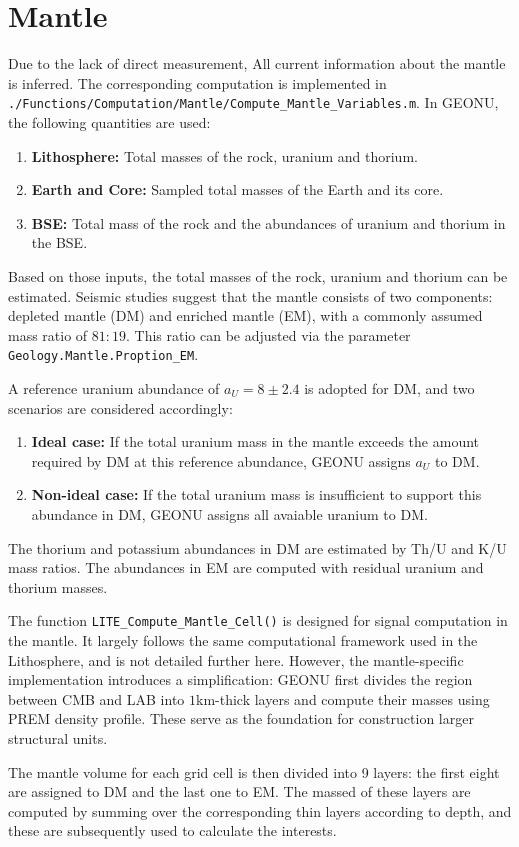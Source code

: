 		\section{Mantle}
			Due to the lack of direct measurement, All current information about the mantle is inferred. The corresponding computation is implemented in \texttt{./Functions/Computation/Mantle/Compute\_Mantle\_Variables.m}. In GEONU, the following quantities are used:
				\begin{enumerate}
					\item \textbf{Lithosphere:} Total masses of the rock, uranium and thorium.
					\item \textbf{Earth and Core:} Sampled total masses of the Earth and its core.
					\item \textbf{BSE:} Total mass of the rock and the abundances of uranium and thorium in the BSE.
				\end{enumerate}
			Based on those inputs, the total masses of the rock, uranium and thorium can be estimated. Seismic studies suggest that the mantle consists of two components: depleted mantle (DM) and enriched mantle (EM), with a commonly assumed mass ratio of $81:19$. This ratio can be adjusted via the parameter \texttt{Geology.Mantle.Proption\_EM}.\par
			A reference uranium abundance of $a_U = 8 \pm 2.4$ is adopted for DM, and two scenarios are considered accordingly:
				\begin{enumerate}
					\item \textbf{Ideal case:} If the total uranium mass in the mantle exceeds the amount required by DM at this reference abundance, GEONU assigns $a_U$ to DM.
					\item \textbf{Non-ideal case:} If the total uranium mass is insufficient to support this abundance in DM, GEONU assigns all avaiable uranium to DM.
				\end{enumerate}
			The thorium and potassium abundances in DM are estimated by Th/U and K/U mass ratios. The abundances in EM are computed with residual uranium and thorium masses.\par
			The function \texttt{LITE\_Compute\_Mantle\_Cell()} is designed for signal computation in the mantle. It largely follows the same computational framework used in the Lithosphere, and is not detailed further here. However, the mantle-specific implementation introduces a simplification: GEONU first divides the region between CMB and LAB  into $1$km-thick layers and compute their masses using PREM density profile. These serve as the foundation for construction larger structural units.\par
			The mantle volume for each grid cell is then divided into 9 layers: the first eight are assigned to DM and the last one to EM. The massed of these layers are computed by summing over the corresponding thin layers according to depth, and these are subsequently used to calculate the interests. 
				
